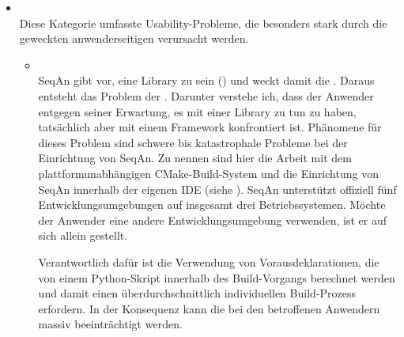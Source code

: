 \begin{itemize}
  \item[\codebullet{apiua://code/-9223372036854774828}] \textbf{} \\
   Diese Kategorie umfasste Usability-Probleme, die besonders stark durch die geweckten anwenderseitigen  verursacht werden.
   
   \begin{itemize}
     \item[\codebullet{apiua://code/-9223372036854774829}] \textbf{} \\
     SeqAn gibt vor, eine Library zu sein () und weckt damit die . Daraus entsteht das Problem der . Darunter verstehe ich, dass der Anwender entgegen seiner Erwartung, es mit einer Library zu tun zu haben, tatsächlich aber mit einem Framework konfrontiert ist. Phänomene für dieses Problem sind schwere bis katastrophale Probleme bei der Einrichtung von SeqAn. Zu nennen sind hier die Arbeit mit dem plattformunabhängigen CMake-Build-System und die Einrichtung von SeqAn innerhalb der eigenen IDE (siehe ). SeqAn unterstützt offiziell fünf Entwicklungsumgebungen auf insgesamt drei Betriebssystemen. Möchte der Anwender eine andere Entwicklungsumgebung verwenden, ist er auf sich allein gestellt.
     
     Verantwortlich dafür ist die Verwendung von Vorausdeklarationen, die von einem Python-Skript innerhalb des Build-Vorgangs berechnet werden und damit einen überdurchschnittlich individuellen Build-Prozess erfordern. In der Konsequenz kann die  bei den betroffenen Anwendern massiv beeinträchtigt werden.
     

\end{itemize}
\end{itemize}
